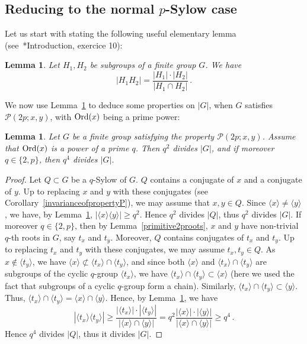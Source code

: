 \documentclass[12pt]{amsart}
\numberwithin{equation}{section}
\newcommand{\Ord}{{\rm Ord}}
\newtheorem{lem}[X]{Lemma}
\theoremstyle{definition}
\theoremstyle{remark}
\begin{document}
\subsection{Reducing to the normal $p$-Sylow case}
Let us start with stating the following useful elementary lemma (see~\cite{Berkovich}*{Introduction, exercice 10}):
\begin{lem}\label{groupproductorder}
    Let $H_1,H_2$ be subgroups of a finite group $G$. We have \[|H_1H_2|= \frac{|H_1|\cdot |H_2|}{|H_1\cap H_2|}\, .\]
\end{lem}
We now use Lemma~\ref{groupproductorder} to deduce some properties on $|G|$, when $G$ satisfies $\mathcal{P}(2p;x,y)$, with $\Ord(x)$ being a prime power:
\begin{lem}\label{q-Sylow-divisibility}
    Let $G$ be a finite group satisfying the property $\mathcal{P}(2p;x,y)$. Assume that $\Ord(x)$ is a power of a prime $q$. Then $q^2$ divides $|G|$, and if moreover $q\in\{2,p\}$, then $q^4$ divides $|G|$.
\end{lem}
\begin{proof}
    Let $Q\subset G$ be a $q$-Sylow of $G$. $Q$ contains a conjugate of $x$ and a conjugate of $y$. Up to replacing $x$ and $y$ with these conjugates (see Corollary~\ref{invarianceofpropertyP}), we may assume that $x,y\in Q$. Since $\langle x\rangle \ne \langle y \rangle $, we have, by Lemma~\ref{groupproductorder}, $|\langle x\rangle \langle y\rangle|\ge q^2$. Hence $q^2$ divides $|Q|$, thus $q^2$ divides $|G|$. If moreover $q\in\{2,p\}$, then by Lemma~\ref{primitive2proots}, $x$ and $y$ have non-trivial $q$-th roots in $G$, say $t_x$ and $t_y$. Moreover, $Q$ contains conjugates of $t_x$ and $t_y$. Up to replacing $t_x$ and $t_y$ with these conjugates, we may assume $t_x,t_y\in Q$. As $x\notin \langle t_y\rangle$, we have $\langle x\rangle \not \subset \langle t_x \rangle \cap \langle t_y\rangle $, and since both $\langle x\rangle$ and $\langle t_x \rangle \cap \langle t_y\rangle$ are subgroups of the cyclic $q$-group $\langle t_x\rangle$, we have $\langle t_x \rangle \cap \langle t_y\rangle \subset \langle x\rangle$ (here we used the fact that subgroups of a cyclic $q$-group form a chain). Similarly, $\langle t_x \rangle \cap \langle t_y\rangle \subset \langle y\rangle$. Thus, $\langle t_x \rangle \cap \langle t_y\rangle = \langle x\rangle\cap \langle y \rangle$. Hence, by Lemma~\ref{groupproductorder}, we have \[|\langle t_x\rangle\langle t_y\rangle|\ge \frac{|\langle t_x\rangle|\cdot|\langle t_y\rangle|}{|\langle x\rangle\cap\langle y\rangle|}=q^2 \frac{|\langle x\rangle|\cdot|\langle y\rangle|}{|\langle x\rangle\cap \langle y\rangle|}\ge q^4\, .\]
    Hence $q^4$ divides $|Q|$, thus it divides $|G|$.
\end{proof}
\end{document}
